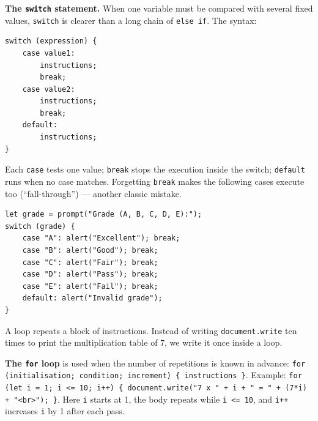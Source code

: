 \documentclass[11pt]{article}
\newcommand{\cle}[1]{{\popxbold\color{popdark}#1}}
\newcounter{popsec}
\newcounter{popsub}
\newcommand{\courssub}[1]{%
  \stepcounter{popsub}%
  \par\vspace{9pt}\noindent{\popxbold\fontsize{11.5}{13}\selectfont\color{popink}{\color{poporange}\thepopsec.\thepopsub}\hspace{6pt}#1}\par\nopagebreak\vspace{4pt}
}
\begin{document}
\textbf{The \texttt{switch} statement.} When one variable must be compared with several fixed values, \texttt{switch} is clearer than a long chain of \texttt{else if}. The syntax:
\begin{verbatim}
switch (expression) {
    case value1:
        instructions;
        break;
    case value2:
        instructions;
        break;
    default:
        instructions;
}
\end{verbatim}
Each \texttt{case} tests one value; \texttt{break} stops the execution inside the switch; \texttt{default} runs when no case matches. Forgetting \texttt{break} makes the following cases execute too (``fall-through'') --- another classic mistake.

\begin{exemplebox}
\begin{verbatim}
let grade = prompt("Grade (A, B, C, D, E):");
switch (grade) {
    case "A": alert("Excellent"); break;
    case "B": alert("Good"); break;
    case "C": alert("Fair"); break;
    case "D": alert("Pass"); break;
    case "E": alert("Fail"); break;
    default: alert("Invalid grade");
}
\end{verbatim}
\end{exemplebox}

\courssub{Loops: for and while}

A \cle{loop} repeats a block of instructions. Instead of writing \texttt{document.write} ten times to print the multiplication table of 7, we write it once inside a loop.

\textbf{The \texttt{for} loop} is used when the number of repetitions is known in advance:
\texttt{for (initialisation; condition; increment) \{ instructions \}}. Example:
\texttt{for (let i = 1; i <= 10; i++) \{ document.write("7 x " + i + " = " + (7*i) + "<br>"); \}}. Here \texttt{i} starts at 1, the body repeats while \texttt{i <= 10}, and \texttt{i++} increases \texttt{i} by 1 after each pass.
\end{document}
